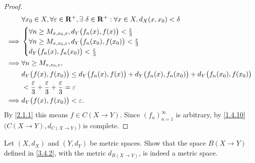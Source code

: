 \begin{proof}
  \begin{align*}
             & \forall x_0 \in X, \forall \varepsilon \in \mathbf{R}^+, \exists\ \delta \in \mathbf{R}^+ : \forall x \in X, d_X(x, x_0) < \delta        \\
    \implies & \begin{cases}
                 \forall n \geq M_{x, x_0, \varepsilon}, d_Y\big(f_n(x), f(x)\big) < \frac{\varepsilon}{3}     \\
                 \forall n \geq M_{x, x_0, \varepsilon}, d_Y\big(f_n(x_0), f(x_0)\big) < \frac{\varepsilon}{3} \\
                 d_Y\big(f_n(x), f_n(x_0)\big) < \frac{\varepsilon}{3}
               \end{cases}                            \\
    \implies & \forall n \geq M_{x, x_0, \varepsilon},                                                                                  \\
             & d_Y\big(f(x), f(x_0)\big) \leq d_Y\big(f_n(x), f(x)\big) + d_Y\big(f_n(x), f_n(x_0)\big) + d_Y\big(f_n(x_0), f(x_0)\big) \\
             & < \frac{\varepsilon}{3} + \frac{\varepsilon}{3} + \frac{\varepsilon}{3} = \varepsilon                                    \\
    \implies & d_Y\big(f(x), f(x_0)\big) < \varepsilon.
  \end{align*}
  By \cref{2.1.1} this means \(f \in C(X \to Y)\).
  Since \((f_n)_{n = 1}^\infty\) is arbitrary, by \cref{1.4.10} \(\big(C(X \to Y), d_{C(X \to Y)}\big)\) is complete.
\end{proof}

\exercisesection

\begin{exercise}\label{ex 3.4.1}
  Let \((X, d_X)\) and \((Y, d_Y)\) be metric spaces.
  Show that the space \(B(X \to Y)\) defined in \cref{3.4.2}, with the metric \(d_{B(X \to Y)}\), is indeed a metric space.
\end{exercise}

